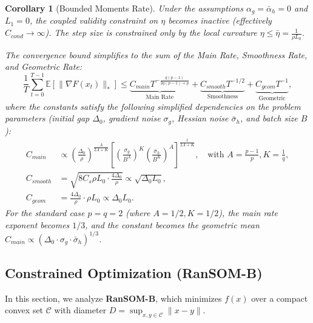 \documentclass{article}
\theoremstyle{plain}
\newtheorem{corollary}[theorem]{Corollary}
\theoremstyle{definition}
\theoremstyle{remark}
\begin{document}
\begin{corollary}[Bounded Moments Rate]
Under the assumptions $\alpha_g = \bar{\alpha}_h = 0$ and $L_1 = 0$, the coupled validity constraint on $\eta$ becomes inactive (effectively $C_{cond} \to \infty$). The step size is constrained only by the local curvature $\eta \le \bar{\eta} = \frac{1}{\rho L_0}$.

The convergence bound simplifies to the sum of the Main Rate, Smoothness Rate, and Geometric Rate:
\begin{equation}
\label{eq:simple_heavy_rate}
    \frac{1}{T} \sum_{t=0}^{T-1} \mathbb{E}[\|\nabla F(x_t)\|_*] \le \underbrace{C_{main} T^{-\frac{q(p-1)}{2q(p-1)+p}}}_{\text{Main Rate}} + \underbrace{C_{smooth} T^{-1/2}}_{\text{Smoothness}} + \underbrace{C_{geom} T^{-1}}_{\text{Geometric}},
\end{equation}
where the constants satisfy the following simplified dependencies on the problem parameters (initial gap $\Delta_0$, gradient noise $\sigma_g$, Hessian noise $\bar{\sigma}_h$, and batch size $B$):
\begin{align}
    C_{main} &\propto \left( \frac{\Delta_0}{\rho} \right)^{\frac{A}{2A+K}} \left[ \left(\frac{\sigma_g}{B^A}\right)^K \left(\frac{\bar{\sigma}_h}{B^K}\right)^A \right]^{\frac{1}{2A+K}}, \quad \text{with } A=\frac{p-1}{p}, K=\frac{1}{q}, \\
    C_{smooth} &= \sqrt{8 C_s \rho L_0 \cdot \frac{4\Delta_0}{\rho}} \propto \sqrt{\Delta_0 L_0}, \\
    C_{geom} &= \frac{4\Delta_0}{\rho} \cdot \rho L_0 \propto \Delta_0 L_0.
\end{align}
For the standard case $p=q=2$ (where $A=1/2, K=1/2$), the main rate exponent becomes $1/3$, and the constant becomes the geometric mean $C_{main} \propto (\Delta_0 \cdot \sigma_g \cdot \bar{\sigma}_h)^{1/3}$.
\end{corollary}


\subsection{Constrained Optimization (RanSOM-B)}

In this section, we analyze \textbf{RanSOM-B}, which minimizes $f(x)$ over a compact convex set $\mathcal{C}$ with diameter $D = \sup_{x,y \in \mathcal{C}} \|x-y\|$.
\end{document}
